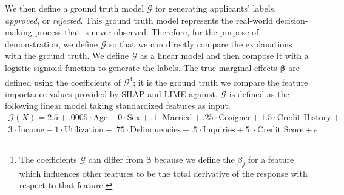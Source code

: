 \documentclass[12pt]{article}  %
\begin{document}

  We then define a ground truth model $\mathcal{G}$ for generating applicants' labels, \textit{approved}, or \textit{rejected}. This ground truth model represents the real-world decision-making process that is never observed. Therefore, for the purpose of demonstration, we define $\mathcal{G}$ so that we can directly compare the explanations with the ground truth. We define $\mathcal{G}$ as a linear model and then compose it with a logistic sigmoid function to generate the labels. The true marginal effects $\boldsymbol{\beta}$ are defined using the coefficients of $\mathcal{G}$\footnote{The coefficients $\mathcal{G}$ can differ from $\boldsymbol{\beta}$ because we define the $\beta_j$ for a feature which influences other features to be the total derivative of the response with respect to that feature.}; it is the ground truth we compare the feature importance values provided by SHAP and LIME against. $\mathcal{G}$ is defined as the following linear model taking standardized features as input. 
  \vspace{-2mm}
  \begin{equation}
  \label{eqn:gt}
  \begin{split}
  \mathcal{G}(X) =2.5 +.0005\cdot\text{Age} -0\cdot\text{Sex} +.1 \cdot \text{Married} + .25\cdot \text{Cosigner} + 1.5 \cdot \text{Credit History} + \\  3 \cdot \text{Income} - 1\cdot\text{Utilization} -.75 \cdot \text{Delinquencies} - .5\cdot\text{Inquiries} + 5.\cdot\text{Credit Score} + \epsilon
  \end{split}
  \end{equation} \vspace{-2mm}
\end{document}
